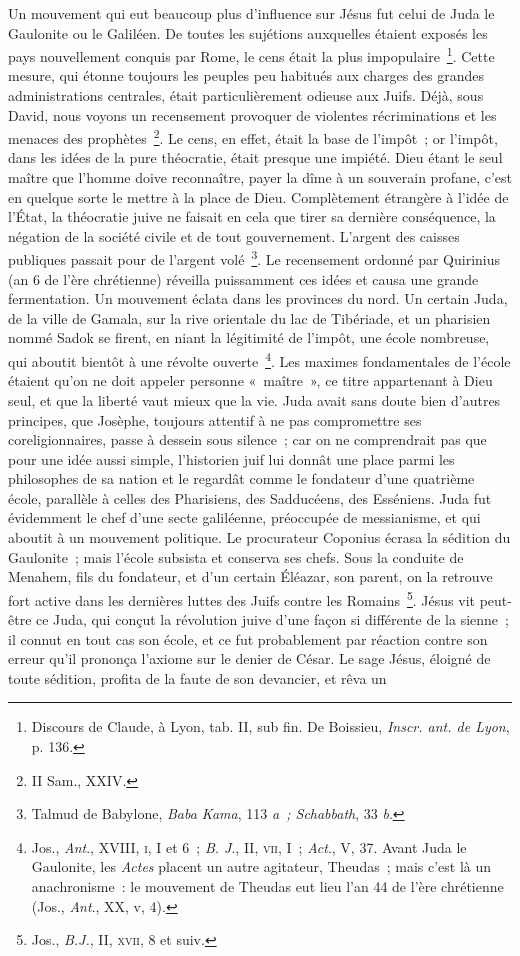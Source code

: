 \documentclass[french,twoside]{book} %
\begin{document}
Un mouvement qui eut beaucoup plus d’influence sur Jésus fut celui de Juda le Gaulonite ou le Galiléen. De toutes les sujétions auxquelles étaient exposés les pays nouvellement conquis par Rome, le cens était la plus impopulaire \footnote{ Discours de Claude, à Lyon, tab. II, sub fin. De Boissieu, {\itshape Inscr. ant. de Lyon}, p. 136.}. Cette mesure, qui étonne toujours les peuples peu habitués aux charges des grandes administrations centrales, était particulièrement odieuse aux Juifs. Déjà, sous David, nous voyons un recensement provoquer de violentes récriminations et les menaces des prophètes \footnote{II Sam., XXIV.}. Le cens, en effet, était la base de l’impôt ; or l’impôt, dans les idées de la pure théocratie, était presque une impiété. Dieu étant le seul maître que l’homme doive reconnaître, payer la dîme à un souverain profane, c’est en quelque sorte le mettre à la place de Dieu. Complètement étrangère à l’idée de l’État, la théocratie juive ne faisait en cela que tirer sa dernière conséquence, la négation de la société civile et de tout gouvernement. L’argent des caisses publiques passait pour de l’argent volé \footnote{ Talmud de Babylone, {\itshape Baba Kama}, 113 {\itshape a ; Schabbath}, 33 {\itshape b}.}. Le recensement ordonné par Quirinius (an 6 de l’ère chrétienne) réveilla puissamment ces idées et causa une grande fermentation. Un mouvement éclata dans les provinces du nord. Un certain Juda, de la ville de Gamala, sur la rive orientale du lac de Tibériade, et un pharisien nommé Sadok se firent, en niant la légitimité de l’impôt, une école nombreuse, qui aboutit bientôt à une révolte ouverte \footnote{ Jos., {\itshape Ant}., XVIII, \textsc{i}, I et 6 ; {\itshape B. J}., II, \textsc{vii}, I ; {\itshape Act}., V, 37. Avant Juda le Gaulonite, les {\itshape Actes} placent un autre agitateur, Theudas ; mais c’est là un anachronisme : le mouvement de Theudas eut lieu l’an 44 de l’ère chrétienne (Jos., {\itshape Ant}., XX, v, 4).}. Les maximes fondamentales de l’école étaient qu’on ne doit appeler personne « maître », ce titre appartenant à Dieu seul, et que la liberté vaut mieux que la vie. Juda avait sans doute bien d’autres principes, que Josèphe, toujours attentif à ne pas compromettre ses coreligionnaires, passe à dessein sous silence ; car on ne comprendrait pas que pour une idée aussi simple, l’historien juif lui donnât une place parmi les philosophes de sa nation et le regardât comme le fondateur d’une quatrième école, parallèle à celles des Pharisiens, des Sadducéens, des Esséniens. Juda fut évidemment le chef d’une secte galiléenne, préoccupée de messianisme, et qui aboutit à un mouvement politique. Le procurateur Coponius écrasa la sédition du Gaulonite ; mais l’école subsista et conserva ses chefs. Sous la conduite de Menahem, fils du fondateur, et d’un certain Éléazar, son parent, on la retrouve fort active dans les dernières luttes des Juifs contre les Romains \footnote{ Jos., {\itshape B.J.}, II, \textsc{xvii}, 8 et suiv.}. Jésus vit peut-être ce Juda, qui conçut la révolution juive d’une façon si différente de la sienne ; il connut en tout cas son école, et ce fut probablement par réaction contre son erreur qu’il prononça l’axiome sur le denier de César. Le sage Jésus, éloigné de toute sédition, profita de la faute de son devancier, et rêva un 
\end{document}
